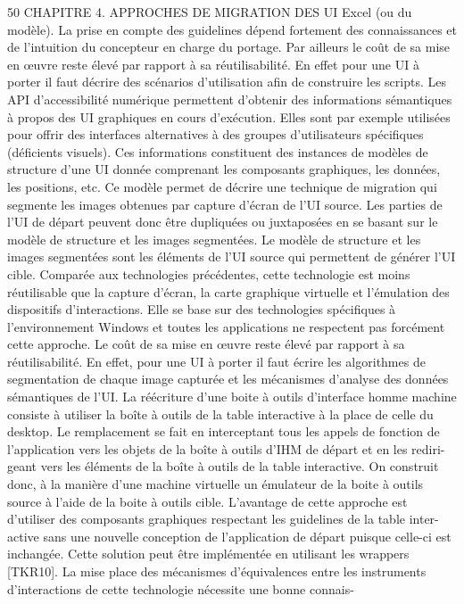\documentclass{article}
\begin{document}
50
CHAPITRE 4. APPROCHES DE MIGRATION DES UI
Excel (ou du modèle). La prise en compte des guidelines dépend fortement des connaissances et de
l’intuition du concepteur en charge du portage. Par ailleurs le coût de sa mise en œuvre reste élevé par
rapport à sa réutilisabilité. En effet pour une UI à porter il faut décrire des scénarios d’utilisation aﬁn
de construire les scripts.
Les API d’accessibilité numérique
permettent d’obtenir des informations sémantiques à propos
des UI graphiques en cours d’exécution. Elles sont par exemple utilisées pour offrir des interfaces
alternatives à des groupes d’utilisateurs spéciﬁques (déﬁcients visuels). Ces informations constituent
des instances de modèles de structure d’une UI donnée comprenant les composants graphiques, les
données, les positions, etc. Ce modèle permet de décrire une technique de migration qui segmente
les images obtenues par capture d’écran de l’UI source. Les parties de l’UI de départ peuvent donc
être dupliquées ou juxtaposées en se basant sur le modèle de structure et les images segmentées. Le
modèle de structure et les images segmentées sont les éléments de l’UI source qui permettent de
générer l’UI cible. Comparée aux technologies précédentes, cette technologie est moins réutilisable
que la capture d’écran, la carte graphique virtuelle et l’émulation des dispositifs d’interactions. Elle
se base sur des technologies spéciﬁques à l’environnement Windows et toutes les applications ne
respectent pas forcément cette approche. Le coût de sa mise en œuvre reste élevé par rapport à sa
réutilisabilité. En effet, pour une UI à porter il faut écrire les algorithmes de segmentation de chaque
image capturée et les mécanismes d’analyse des données sémantiques de l’UI.
La réécriture d’une boite à outils d’interface homme machine
consiste à utiliser la boîte à outils
de la table interactive à la place de celle du desktop. Le remplacement se fait en interceptant tous les
appels de fonction de l’application vers les objets de la boîte à outils d’IHM de départ et en les rediri-
geant vers les éléments de la boîte à outils de la table interactive. On construit donc, à la manière d’une
machine virtuelle un émulateur de la boite à outils source à l’aide de la boite à outils cible. L’avantage
de cette approche est d’utiliser des composants graphiques respectant les guidelines de la table inter-
active sans une nouvelle conception de l’application de départ puisque celle-ci est inchangée. Cette
solution peut être implémentée en utilisant les wrappers [TKR10]. La mise place des mécanismes
d’équivalences entre les instruments d’interactions de cette technologie nécessite une bonne connais-
\end{document}
